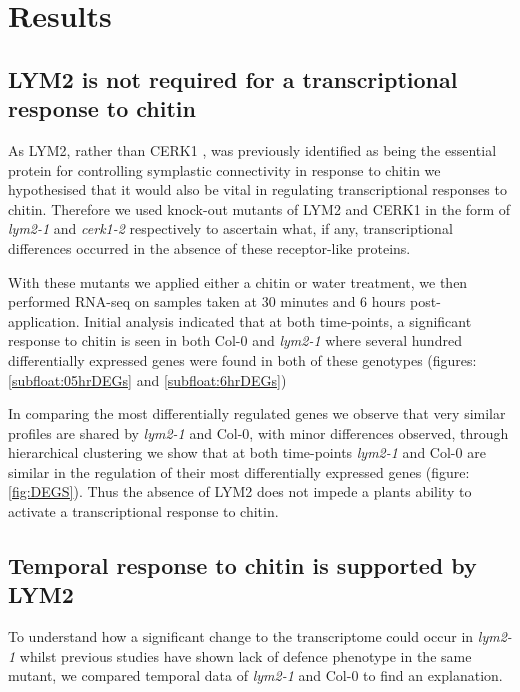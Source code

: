 \documentclass[../main.tex]{subfiles}
\begin{document}
\section{Results}

\subsection{LYM2 is not required for a transcriptional response to chitin}

As LYM2, rather than CERK1 \cite{miyaCERK1LysMReceptor2007}, was previously
identified as being the essential protein for controlling symplastic
connectivity in response to chitin \cite{Faulkner2013} we hypothesised that it would also be vital
in regulating transcriptional responses to chitin. Therefore we used knock-out
mutants of LYM2 and CERK1 in the form of \textit{lym2-1} and \textit{cerk1-2}
respectively to ascertain what, if any, transcriptional differences occurred in
the absence of these receptor-like proteins.

With these mutants we applied either a chitin or water treatment, we then
performed RNA-seq on samples taken at 30 minutes and 6 hours post-application.
Initial analysis indicated that at both time-points, a significant
response to chitin is seen in both Col-0 and \textit{lym2-1} where several
hundred differentially expressed genes were found in both of these genotypes (figures:
\ref{subfloat:05hrDEGs} and \ref{subfloat:6hrDEGs})

In comparing the most differentially regulated genes we observe that very
similar profiles are shared by \textit{lym2-1} and Col-0, with minor differences
observed, through hierarchical clustering we show that at both time-points
\textit{lym2-1} and Col-0 are similar in the regulation of their most
differentially expressed genes (figure: \ref{fig:DEGS}). Thus the absence of
LYM2 does not impede a plants ability to activate a transcriptional response to chitin.



\subsection{Temporal response to chitin is supported by LYM2}

To understand how a significant change to the transcriptome could occur in
\textit{lym2-1} whilst previous studies have shown lack of defence phenotype in
the same mutant, we compared temporal data of \textit{lym2-1} and Col-0 to find
an explanation.
\end{document}
